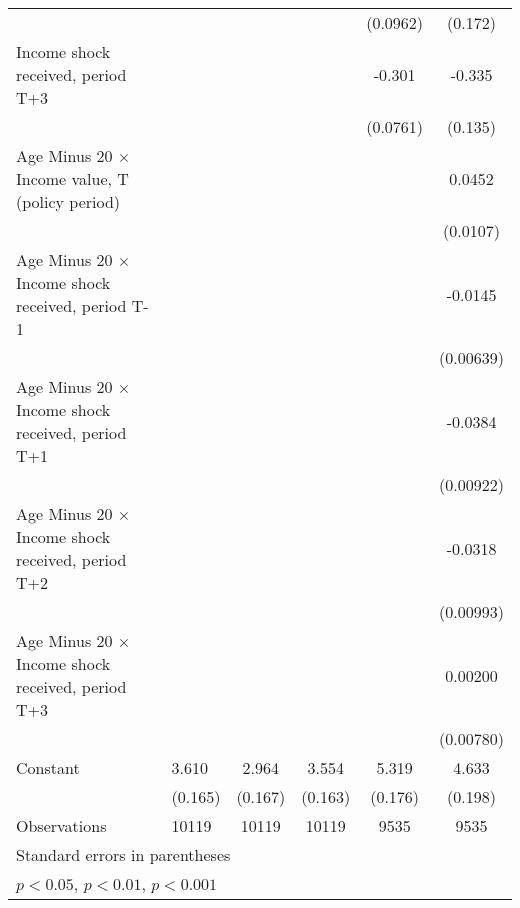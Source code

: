 \begin{table}[htbp]
\begin{tabular}{p{1.2in}l*{4}{c}}
                    &                     &                     &                     &    (0.0962)         &     (0.172)         \\
Income shock received, period T+3&                     &                     &                     &      -0.301\sym{***}&      -0.335\sym{*}  \\
                    &                     &                     &                     &    (0.0761)         &     (0.135)         \\
Age Minus 20 $\times$ Income value, T (policy period)&                     &                     &                     &                     &      0.0452\sym{***}\\
                    &                     &                     &                     &                     &    (0.0107)         \\
Age Minus 20 $\times$ Income shock received, period T-1&                     &                     &                     &                     &     -0.0145\sym{*}  \\
                    &                     &                     &                     &                     &   (0.00639)         \\
Age Minus 20 $\times$ Income shock received, period T+1&                     &                     &                     &                     &     -0.0384\sym{***}\\
                    &                     &                     &                     &                     &   (0.00922)         \\
Age Minus 20 $\times$ Income shock received, period T+2&                     &                     &                     &                     &     -0.0318\sym{**} \\
                    &                     &                     &                     &                     &   (0.00993)         \\
Age Minus 20 $\times$ Income shock received, period T+3&                     &                     &                     &                     &     0.00200         \\
                    &                     &                     &                     &                     &   (0.00780)         \\
Constant            &       3.610\sym{***}&       2.964\sym{***}&       3.554\sym{***}&       5.319\sym{***}&       4.633\sym{***}\\
                    &     (0.165)         &     (0.167)         &     (0.163)         &     (0.176)         &     (0.198)         \\
\hline
Observations        &       10119         &       10119         &       10119         &        9535         &        9535         \\
\hline\hline
\multicolumn{6}{l}{\footnotesize Standard errors in parentheses}\\
\multicolumn{6}{l}{\footnotesize \sym{*} \(p<0.05\), \sym{**} \(p<0.01\), \sym{***} \(p<0.001\)}\\
\end{tabular}
\end{table}

